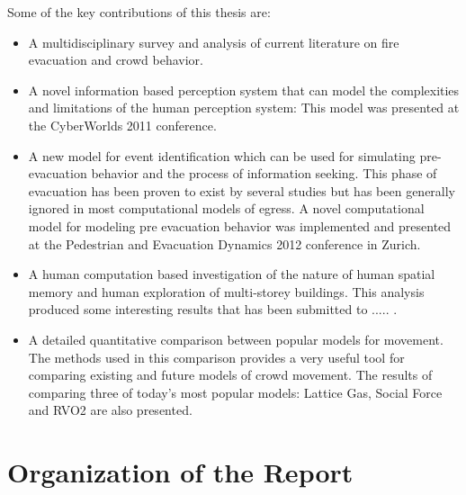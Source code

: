 Some of the key contributions of this thesis are:
\begin{itemize}
	\item A multidisciplinary survey and analysis of current literature on fire evacuation and crowd behavior.


	\item A novel information based perception system that can model the complexities and limitations of the human perception system: This model was presented at the CyberWorlds 2011 conference.

	\item A new model for event identification which can be used for simulating pre-evacuation behavior and the process of information seeking. This phase of evacuation has been proven to exist by several studies but has been generally ignored in most computational models of egress. A novel computational model for modeling pre evacuation behavior was implemented and presented at the Pedestrian and Evacuation Dynamics 2012 conference in Zurich.

	\item A human computation based investigation of the nature of human spatial memory and human exploration of multi-storey buildings. This analysis produced some interesting results that has been submitted to  .....  .

    \item A detailed quantitative comparison between popular models for movement. The methods used in this comparison provides a very useful tool for comparing existing and future models of crowd movement. The results of comparing three of today's most popular models: Lattice Gas, Social Force and RVO2 are also presented.



\end{itemize}


\section{Organization of the Report}
\label{Intro:Organisation}

